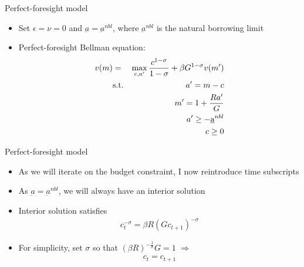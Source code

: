\documentclass[9pt]{beamer}
\newcommand{\bit}{\begin{itemize}}
\newcommand{\eit}{\end{itemize}}
\begin{document}
\begin{frame}{Perfect-foresight model}

\bit
\setlength\itemsep{1.5em}

\item Set $\epsilon=\nu=0$ and $\underbar a = \underbar a^{nbl}$, where $\underbar a^{nbl}$ is the natural borrowing limit

\item Perfect-foresight Bellman equation:
\begin{eqnarray}
v({\color{black}m}) &=& \max_{c, a'} \frac{c^{1-\sigma}}{1-\sigma} + \beta G^{1-\sigma} v({\color{black}m'}) \nonumber \\
&\text{s.t.}& a' = m - c \nonumber \\
&& m' = 1 + \frac{Ra'}{G} \nonumber \\
&& a' \geq -\underbar a^{nbl} \nonumber \\
&& c \geq 0 \nonumber
\end{eqnarray}

\eit
\end{frame}


\begin{frame}{Perfect-foresight model}

\bit
\setlength\itemsep{1.5em}

\item As we will iterate on the budget constraint, I now reintroduce time subscripts

\item As $\underbar a = \underbar a^{nbl}$, we will always have an interior solution

\item Interior solution satisfies
\begin{align*}
c_t^{-\sigma} = \beta R \left(Gc_{t+1}\right)^{-\sigma}
\end{align*}

\item For simplicity, set $\sigma$ so that $\left(\beta R\right)^{-\frac{1}{\sigma}} G=1$ $\Rightarrow$
\begin{align*}
c_t = c_{t+1}
\end{align*}


\eit
\end{frame}
\end{document}
